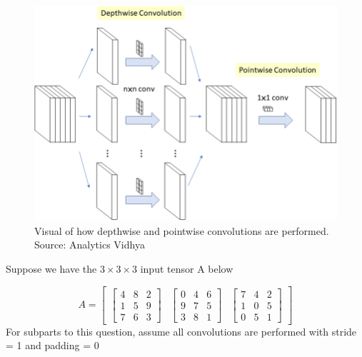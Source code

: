 \documentclass{article}
\begin{document}
\begin{figure}[h]
  \centering
  \includegraphics[scale=0.35]{Depthwise-Separable_Conv.png}
  \caption{Visual of how depthwise and pointwise convolutions are performed. Source: Analytics Vidhya}
  \label{fig:example}
\end{figure}

\newpage
\thispagestyle{plain}
Suppose we have the $3 \times 3 \times 3$ input tensor A below

\[ A = 
\begin{bmatrix}
    \begin{bmatrix}
        4 & 8 & 2 \\
        1 & 5 & 9 \\
        7 & 6 & 3
    \end{bmatrix}
    &
    \begin{bmatrix}
        0 & 4 & 6 \\
        9 & 7 & 5 \\
        3 & 8 & 1
    \end{bmatrix}
    &
    \begin{bmatrix}
        7 & 4 & 2 \\
        1 & 0 & 5 \\
        0 & 5 & 1
    \end{bmatrix}
\end{bmatrix}
\]
\newline\newline
 For subparts to this question, assume all convolutions are performed with stride = 1 and padding = 0
\end{document}
